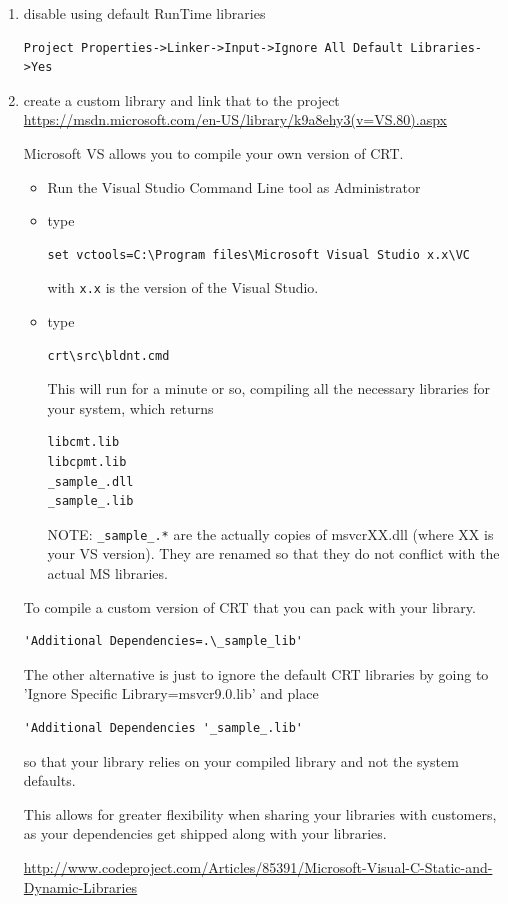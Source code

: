 \begin{enumerate}
  \item disable using default RunTime libraries
\begin{verbatim}
Project Properties->Linker->Input->Ignore All Default Libraries->Yes
\end{verbatim}

  \item create a custom library and link that to the project
\url{https://msdn.microsoft.com/en-US/library/k9a8ehy3(v=VS.80).aspx}
  
Microsoft VS allows you to compile your own version of CRT.
\begin{itemize}
  \item Run the Visual Studio Command Line tool as Administrator
  
  \item type
\begin{verbatim}
set vctools=C:\Program files\Microsoft Visual Studio x.x\VC
\end{verbatim}
with \verb!x.x! is the version of the Visual Studio.

  \item type
\begin{verbatim}
crt\src\bldnt.cmd
\end{verbatim}

This will run for a minute or so, compiling all the necessary libraries for your system, which returns
\begin{verbatim}
libcmt.lib
libcpmt.lib
_sample_.dll
_sample_.lib
\end{verbatim}
NOTE: \verb!_sample_.*! are the actually copies of msvcrXX.dll (where XX is your VS version). 
They are renamed so that they do not conflict with the actual MS libraries.


\end{itemize}

To compile a custom version of CRT that you can pack with your library.

\begin{verbatim}
'Additional Dependencies=.\_sample_lib'
\end{verbatim}
  
The other alternative is just to ignore the default CRT libraries by going to
'Ignore Specific Library=msvcr9.0.lib' and place
\begin{verbatim}
'Additional Dependencies '_sample_.lib' 
\end{verbatim}
so that your library relies on your compiled library and not the
system defaults.

This allows for greater flexibility when sharing your libraries with customers,
as your dependencies get shipped along with your libraries.

\url{http://www.codeproject.com/Articles/85391/Microsoft-Visual-C-Static-and-Dynamic-Libraries}  
\end{enumerate}




